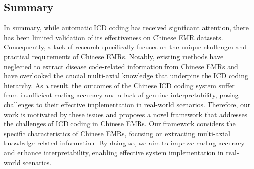 \subsection{Summary}

In summary, while automatic ICD coding has received significant attention, there has been limited validation of its effectiveness on Chinese EMR datasets. Consequently, a lack of research specifically focuses on the unique challenges and practical requirements of Chinese EMRs. Notably, existing methods have neglected to extract disease code-related information from Chinese EMRs and have overlooked the crucial multi-axial knowledge that underpins the ICD coding hierarchy. As a result, the outcomes of the Chinese ICD coding system suffer from insufficient coding accuracy and a lack of genuine interpretability, posing challenges to their effective implementation in real-world scenarios. Therefore, our work is motivated by these issues and proposes a novel framework that addresses the challenges of ICD coding in Chinese EMRs. Our framework considers the specific characteristics of Chinese EMRs, focusing on extracting multi-axial knowledge-related information. By doing so, we aim to improve coding accuracy and enhance interpretability, enabling effective system implementation in real-world scenarios.